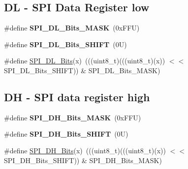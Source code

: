 \subsection*{DL -\/ S\+PI Data Register low}
\begin{DoxyCompactItemize}
\item 
\mbox{\label{group___s_p_i___register___masks_gab0bad5d31bd1cb5fef90d0d2220e770f}} 
\#define {\bfseries S\+P\+I\+\_\+\+D\+L\+\_\+\+Bits\+\_\+\+M\+A\+SK}~(0x\+F\+F\+U)
\item 
\mbox{\label{group___s_p_i___register___masks_ga01acf774167b947037841132f02cca41}} 
\#define {\bfseries S\+P\+I\+\_\+\+D\+L\+\_\+\+Bits\+\_\+\+S\+H\+I\+FT}~(0\+U)
\item 
\#define \mbox{\hyperlink{group___s_p_i___register___masks_ga86e3bbf34ddf7b9cda3fc9a62e2f6404}{S\+P\+I\+\_\+\+D\+L\+\_\+\+Bits}}(x)~(((uint8\+\_\+t)(((uint8\+\_\+t)(x)) $<$$<$ S\+P\+I\+\_\+\+D\+L\+\_\+\+Bits\+\_\+\+S\+H\+I\+FT)) \& S\+P\+I\+\_\+\+D\+L\+\_\+\+Bits\+\_\+\+M\+A\+SK)
\end{DoxyCompactItemize}
\subsection*{DH -\/ S\+PI data register high}
\begin{DoxyCompactItemize}
\item 
\mbox{\label{group___s_p_i___register___masks_ga2bbe93bb6f68edc9ad343fac000ce3a9}} 
\#define {\bfseries S\+P\+I\+\_\+\+D\+H\+\_\+\+Bits\+\_\+\+M\+A\+SK}~(0x\+F\+F\+U)
\item 
\mbox{\label{group___s_p_i___register___masks_ga994f4c3d8c6a73e19423c162a9418424}} 
\#define {\bfseries S\+P\+I\+\_\+\+D\+H\+\_\+\+Bits\+\_\+\+S\+H\+I\+FT}~(0\+U)
\item 
\#define \mbox{\hyperlink{group___s_p_i___register___masks_ga5c2eb260b79200f0e7d355e83d1e7418}{S\+P\+I\+\_\+\+D\+H\+\_\+\+Bits}}(x)~(((uint8\+\_\+t)(((uint8\+\_\+t)(x)) $<$$<$ S\+P\+I\+\_\+\+D\+H\+\_\+\+Bits\+\_\+\+S\+H\+I\+FT)) \& S\+P\+I\+\_\+\+D\+H\+\_\+\+Bits\+\_\+\+M\+A\+SK)
\end{DoxyCompactItemize}
